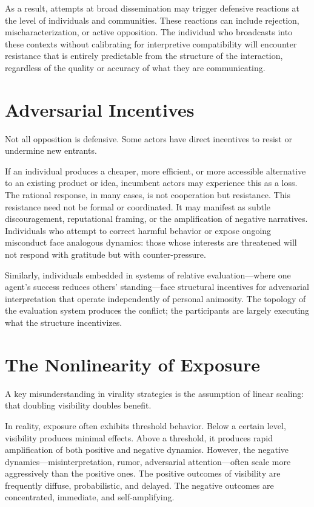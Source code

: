 \documentclass[12pt,a4paper]{article}
\begin{document}
As a result, attempts at broad dissemination may trigger defensive reactions at the level of individuals and communities. These reactions can include rejection, mischaracterization, or active opposition. The individual who broadcasts into these contexts without calibrating for interpretive compatibility will encounter resistance that is entirely predictable from the structure of the interaction, regardless of the quality or accuracy of what they are communicating.

\section{Adversarial Incentives}

Not all opposition is defensive. Some actors have direct incentives to resist or undermine new entrants.

If an individual produces a cheaper, more efficient, or more accessible alternative to an existing product or idea, incumbent actors may experience this as a loss. The rational response, in many cases, is not cooperation but resistance. This resistance need not be formal or coordinated. It may manifest as subtle discouragement, reputational framing, or the amplification of negative narratives. Individuals who attempt to correct harmful behavior or expose ongoing misconduct face analogous dynamics: those whose interests are threatened will not respond with gratitude but with counter-pressure.

Similarly, individuals embedded in systems of relative evaluation---where one agent's success reduces others' standing---face structural incentives for adversarial interpretation that operate independently of personal animosity. The topology of the evaluation system produces the conflict; the participants are largely executing what the structure incentivizes.

\section{The Nonlinearity of Exposure}

A key misunderstanding in virality strategies is the assumption of linear scaling: that doubling visibility doubles benefit.

In reality, exposure often exhibits threshold behavior. Below a certain level, visibility produces minimal effects. Above a threshold, it produces rapid amplification of both positive and negative dynamics. However, the negative dynamics---misinterpretation, rumor, adversarial attention---often scale more aggressively than the positive ones. The positive outcomes of visibility are frequently diffuse, probabilistic, and delayed. The negative outcomes are concentrated, immediate, and self-amplifying.
\end{document}
